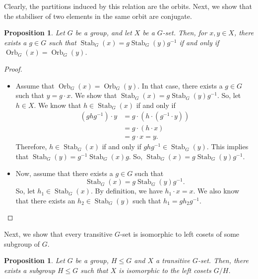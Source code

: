 \documentclass[a4paper, openany]{memoir}
\theoremstyle{definition}
\theoremstyle{plain}
\newtheorem{proposition}[definition]{Proposition}
\begin{document}
\noindent Clearly, the partitions induced by this relation are the orbits. Next, we show that the stabiliser of two elements in the same orbit are conjugate.
\begin{proposition}
Let $G$ be a group, and let $X$ be a $G$-set. Then, for $x, y \in X$, there exists a $g \in G$ such that $\operatorname{Stab}_G(x) = g \operatorname{Stab}_G(y) g^{-1}$ if and only if $\operatorname{Orb}_G(x) = \operatorname{Orb}_G(y)$.
\end{proposition}
\begin{proof}
\hspace*{0pt}
\begin{itemize}
    \item Assume that $\operatorname{Orb}_G(x) = \operatorname{Orb}_G(y)$. In that case, there exists a $g \in G$ such that $y = g \cdot x$. We show that $\operatorname{Stab}_G(x) = g \operatorname{Stab}_G(y) g^{-1}$. So, let $h \in X$. We know that $h \in \operatorname{Stab}_G(x)$ if and only if
    \begin{align*}
        (ghg^{-1}) \cdot y &= g \cdot (h \cdot (g^{-1} \cdot y)) \\
        &= g \cdot (h \cdot x) \\
        &= g \cdot x = y.
    \end{align*}
    Therefore, $h \in \operatorname{Stab}_G(x)$ if and only if $ghg^{-1} \in \operatorname{Stab}_G(y)$. This implies that $\operatorname{Stab}_G(y) = g^{-1} \operatorname{Stab}_G(x) g$. So, $\operatorname{Stab}_G(x) = g \operatorname{Stab}_G(y) g^{-1}$.
    
    \item Now, assume that there exists a $g \in G$ such that 
    \[\operatorname{Stab}_G(x) = g \operatorname{Stab}_G(y) g^{-1}.\]
    So, let $h_1 \in \operatorname{Stab}_G(x)$. By definition, we have $h_1 \cdot x = x$. We also know that there exists an $h_2 \in \operatorname{Stab}_G(y)$ such that $h_1 = gh_2g^{-1}$.
\end{itemize}
\end{proof}
\noindent Next, we show that every transitive $G$-set is isomorphic to left cosets of some subgroup of $G$.
\begin{proposition}
Let $G$ be a group, $H \leq G$ and $X$ a transitive $G$-set. Then, there exists a subgroup $H \leqslant G$ such that $X$ is isomorphic to the left cosets $G/H$.
\end{proposition}
\end{document}

